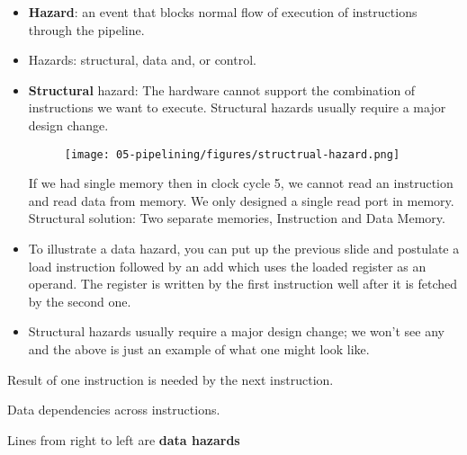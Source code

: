 \begin{frame}[fragile]
\begin{itemize}
\item \textbf{Hazard}: an event that blocks normal flow of execution of instructions through the pipeline.
\item Hazards: structural, data and, or control.

\item \textbf{Structural} hazard: The hardware cannot support the combination of instructions we want to execute. Structural hazards usually require a major design change.

\begin{figure}[H]
\centering
	
   \texttt{[image: 05-pipelining/figures/structrual-hazard.png]}
\end{figure}

{\footnotesize
 \begin{tcolorbox}[enhanced,attach boxed title to top center={yshift=-3mm,yshifttext=-1mm},
  colback=blue!5!white,colframe=blue!75!black,colbacktitle=blue!80!black,
  title=Think About It,fonttitle=\bfseries,
  boxed title style={size=small,colframe=red!50!black} ]
  If we had single memory then in clock cycle 5, we cannot read an instruction and read data from memory. We only designed a single read port in memory.\\
 \ifnum{} {\color{red} Structural solution: Two separate memories, Instruction and Data Memory.}\fi
  \end{tcolorbox}
}

\end{itemize}
\BNotes\ifnum{}
\begin{itemize}
\item To illustrate a data hazard, you can put up the previous slide and 
	postulate a load instruction followed by an add which uses the loaded 
	register as an operand. The register is written by the first 
	instruction well after it is fetched by the second one.
\item Structural hazards usually require a major design change; we
	won't see any and the above is just an example of what one might look
	like.
\end{itemize}
\fi\ENotes
\end{frame}

\begin{frame}[fragile]
Result of one instruction is needed by the next instruction.

Data dependencies across instructions. 

Lines from right to left are \textbf{data hazards}

 \end{frame}


